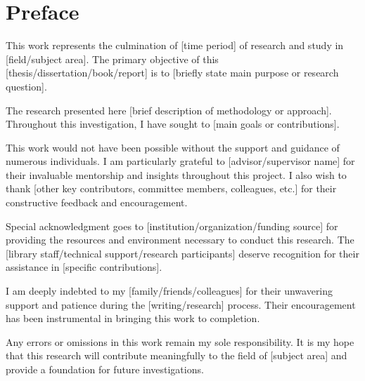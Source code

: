

\chapter*{Preface}

This work represents the culmination of [time period] of research and study in [field/subject area]. The primary objective of this [thesis/dissertation/book/report] is to [briefly state main purpose or research question].

The research presented here [brief description of methodology or approach]. Throughout this investigation, I have sought to [main goals or contributions].

This work would not have been possible without the support and guidance of numerous individuals. I am particularly grateful to [advisor/supervisor name] for their invaluable mentorship and insights throughout this project. I also wish to thank [other key contributors, committee members, colleagues, etc.] for their constructive feedback and encouragement.

Special acknowledgment goes to [institution/organization/funding source] for providing the resources and environment necessary to conduct this research. The [library staff/technical support/research participants] deserve recognition for their assistance in [specific contributions].

I am deeply indebted to my [family/friends/colleagues] for their unwavering support and patience during the [writing/research] process. Their encouragement has been instrumental in bringing this work to completion.

Any errors or omissions in this work remain my sole responsibility. It is my hope that this research will contribute meaningfully to the field of [subject area] and provide a foundation for future investigations.
\vspace{1cm}
